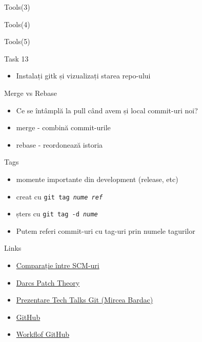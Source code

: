 \documentclass{beamer}
\begin{document}
\begin{frame}{Tools(3)}
\end{frame}

\begin{frame}{Tools(4)}
\end{frame}

\begin{frame}{Tools(5)}
  \begin{alertblock}{Task 13}
    \begin{itemize}
      \item Instalați gitk și vizualizați starea repo-ului
    \end{itemize}
  \end{alertblock}
\end{frame}

\begin{frame}{Merge vs Rebase}
  \begin{itemize}
    \item Ce se întâmplă la pull când avem și local commit-uri noi?
    \pause
    \item merge - combină commit-urile
    \item rebase - reordonează istoria
  \end{itemize}
\end{frame}

\begin{frame}{Tags}
  \begin{itemize}
    \item momente importante din development (release, etc)
    \item creat cu \texttt{git tag \textit{nume} \textit{ref}}
    \item șters cu \texttt{git tag -d \textit{nume}}
    \item Putem referi commit-uri cu tag-uri prin numele tagurilor
  \end{itemize}
\end{frame}

\begin{frame}[label=l]{Links}
  \begin{itemize}
    \item \href{http://en.wikipedia.org/wiki/Comparison_of_revision_control_software}{Comparație între SCM-uri}
    \item \href{http://en.wikibooks.org/wiki/Understanding_Darcs/Patch_theory}{Darcs Patch Theory}
    \item \href{http://talks.rosedu.org/prezentari/prezentarea03}{Prezentare
    Tech Talks Git (Mircea Bardac)}
    \item \href{http://github.com}{GitHub}
    \item
    \href{http://www.eqqon.com/index.php/Collaborative_Github_Workflow}{Workflof
    GitHub}
  \end{itemize}
\end{frame}
\end{document}
